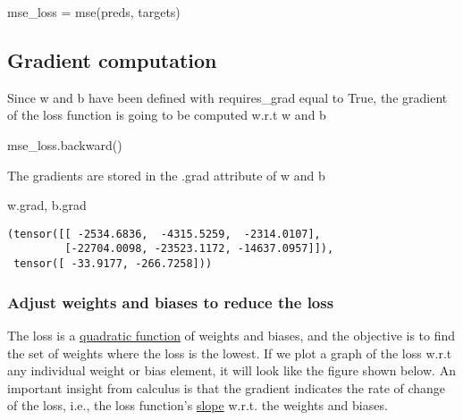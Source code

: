 \documentclass[
  letterpaper,
  DIV=11,
  numbers=noendperiod]{scrartcl}
\newenvironment{Shaded}{\begin{snugshade}}{\end{snugshade}}
\newcommand{\NormalTok}[1]{\textcolor[rgb]{0.00,0.23,0.31}{#1}}
\newcommand{\OperatorTok}[1]{\textcolor[rgb]{0.37,0.37,0.37}{#1}}
\begin{document}
\begin{Shaded}
\begin{Highlighting}[]
\NormalTok{mse\_loss }\OperatorTok{=}\NormalTok{ mse(preds, targets)}
\end{Highlighting}
\end{Shaded}

\hypertarget{gradient-computation}{%
\subsection{Gradient computation}\label{gradient-computation}}

Since w and b have been defined with requires\_grad equal to True, the
gradient of the loss function is going to be computed w.r.t w and b

\begin{Shaded}
\begin{Highlighting}[]
\NormalTok{mse\_loss.backward()}
\end{Highlighting}
\end{Shaded}

The gradients are stored in the .grad attribute of w and b

\begin{Shaded}
\begin{Highlighting}[]
\NormalTok{w.grad, b.grad}
\end{Highlighting}
\end{Shaded}

\begin{verbatim}
(tensor([[ -2534.6836,  -4315.5259,  -2314.0107],
         [-22704.0098, -23523.1172, -14637.0957]]),
 tensor([ -33.9177, -266.7258]))
\end{verbatim}

\hypertarget{adjust-weights-and-biases-to-reduce-the-loss}{%
\subsubsection{Adjust weights and biases to reduce the
loss}\label{adjust-weights-and-biases-to-reduce-the-loss}}

The loss is a
\href{https://en.wikipedia.org/wiki/Quadratic_function}{quadratic
function} of weights and biases, and the objective is to find the set of
weights where the loss is the lowest. If we plot a graph of the loss
w.r.t any individual weight or bias element, it will look like the
figure shown below. An important insight from calculus is that the
gradient indicates the rate of change of the loss, i.e., the loss
function's \href{https://en.wikipedia.org/wiki/Slope}{slope} w.r.t. the
weights and biases.
\end{document}

